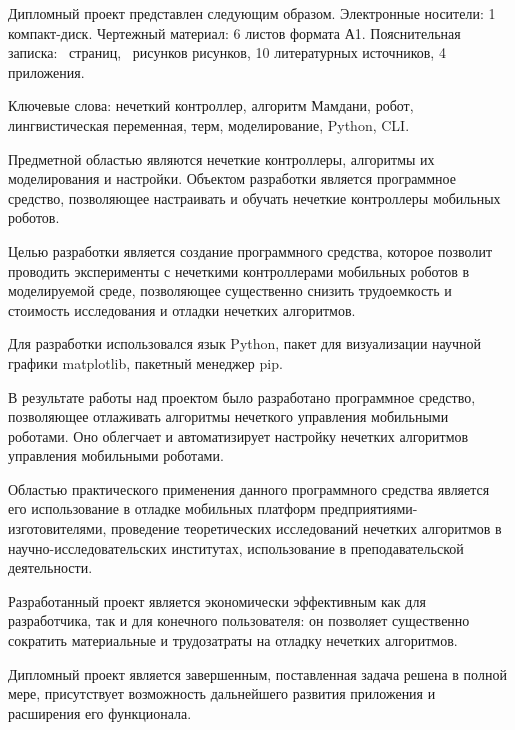 \thispagestyle{empty}

Дипломный проект представлен следующим образом. Электронные
носители: 1 компакт-диск. Чертежный материал: 6 листов формата А1.
Пояснительная записка: \pageref*{LastPage}~страниц, \totfig{}~рисунков рисунков, 10 литературных
источников, 4 приложения.

Ключевые слова: нечеткий контроллер, алгоритм Мамдани, робот,
лингвистическая переменная, терм, моделирование, Python, CLI.

Предметной областью являются нечеткие контроллеры, алгоритмы их
моделирования и настройки. Объектом разработки является программное
средство, позволяющее настраивать и обучать нечеткие контроллеры
мобильных роботов.

Целью разработки является создание программного средства, которое
позволит проводить эксперименты с нечеткими контроллерами мобильных
роботов в моделируемой среде, позволяющее существенно снизить
трудоемкость и стоимость исследования и отладки нечетких алгоритмов.

Для разработки использовался язык Python, пакет для визуализации
научной графики matplotlib, пакетный менеджер pip.

В результате работы над проектом было разработано программное
средство, позволяющее отлаживать алгоритмы нечеткого управления
мобильными роботами. Оно облегчает и автоматизирует настройку нечетких
алгоритмов управления мобильными роботами.

Областью практического применения данного программного средства
является его использование в отладке мобильных платформ предприятиями-
изготовителями, проведение теоретических исследований нечетких
алгоритмов в научно-исследовательских институтах, использование в
преподавательской деятельности.

Разработанный проект является экономически эффективным как для
разработчика, так и для конечного пользователя: он позволяет существенно
сократить материальные и трудозатраты на отладку нечетких алгоритмов.

Дипломный проект является завершенным, поставленная задача
решена в полной мере, присутствует возможность дальнейшего развития
приложения и расширения его функционала. 
\clearpage
